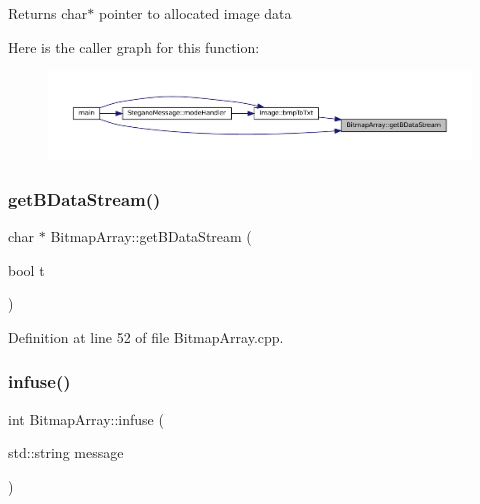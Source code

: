 \begin{DoxyReturn}{Returns}
char$\ast$ pointer to allocated image data 
\end{DoxyReturn}
Here is the caller graph for this function\+:\nopagebreak
\begin{figure}[H]
\begin{center}
\leavevmode
\includegraphics[width=350pt]{classBitmapArray_aebf9b67e7f535bb7e6be62470fe6316e_icgraph}
\end{center}
\end{figure}
\mbox{\label{classBitmapArray_aee1eff9d2e79aaeb10a41bf842766642}} 
\subsubsection{\texorpdfstring{getBDataStream()}{getBDataStream()}\hspace{0.1cm}{\footnotesize\ttfamily [2/2]}}
{\footnotesize\ttfamily char $\ast$ Bitmap\+Array\+::get\+B\+Data\+Stream (\begin{DoxyParamCaption}\item[{bool}]{t }\end{DoxyParamCaption})}



Definition at line 52 of file Bitmap\+Array.\+cpp.

\mbox{\label{classBitmapArray_afb549703b79c26499fc443f187bb3d6a}} 
\subsubsection{\texorpdfstring{infuse()}{infuse()}}
{\footnotesize\ttfamily int Bitmap\+Array\+::infuse (\begin{DoxyParamCaption}\item[{std\+::string}]{message }\end{DoxyParamCaption})}



